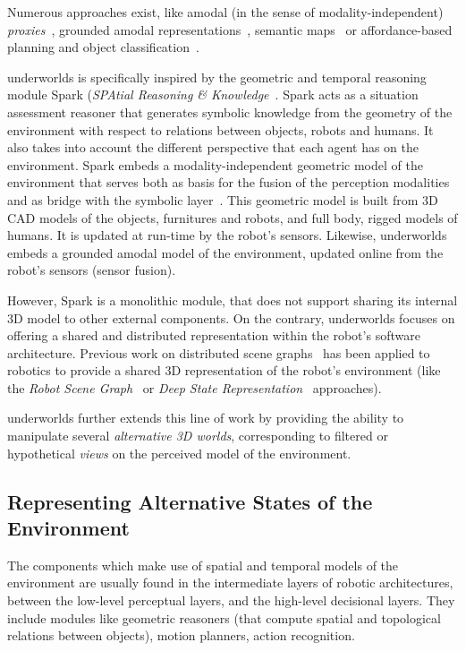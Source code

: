 \documentclass[letterpaper, 10 pt, conference]{ieeeconf}  %
\newcommand{\uwds}{{\sc underworlds}\xspace}
\begin{document}
Numerous approaches exist, like amodal (in the sense of modality-independent)
\emph{proxies}~\cite{Jacobsson2008}, grounded amodal
representations~\cite{Mavridis2006}, semantic
maps~\cite{Nuechter2008, Galindo2008,Blodow2011} or affordance-based planning
and object classification~\cite{Lorken2008, Varadarajan2011}.


\uwds is specifically inspired by the geometric and temporal reasoning module
{\sc Spark} (\emph{SPAtial Reasoning \& Knowledge}~\cite{sisbot2011situation}.
{\sc Spark} acts as a situation assessment reasoner that generates symbolic
knowledge from the geometry of the environment with respect to relations between
objects, robots and humans. It also takes into account the different perspective
that each agent has on the environment. {\sc Spark} embeds a
modality-independent geometric model of the environment that serves both as
basis for the fusion of the perception modalities and as bridge with the
symbolic layer~\cite{lemaignan2016artificial}. This geometric model is built
from 3D CAD models of the objects, furnitures and robots, and full body, rigged
models of humans.  It is updated at run-time by the robot's sensors.
Likewise, \uwds embeds a grounded amodal model of the environment, updated
online from the robot's sensors (sensor fusion).

However, {\sc Spark} is a monolithic module, that does not support sharing its
internal 3D model to other external components. On the contrary, \uwds focuses
on offering a shared and distributed representation within the robot's software
architecture. Previous work on distributed scene graphs~\cite{naef2003blue} has
been applied to robotics to provide a shared 3D representation of the robot's
environment (like the \emph{Robot Scene Graph}~\cite{blumenthal2013scene} or 
\emph{Deep State Representation}~\cite{bustos2016unified} approaches).

\uwds further extends this line of work by providing the ability to manipulate
several \emph{alternative 3D worlds}, corresponding to filtered or hypothetical
\emph{views} on the perceived model of the environment.


\subsection{Representing Alternative States of the Environment}

The components which make use of spatial and temporal models of the environment
are usually found in the intermediate layers of robotic architectures, between
the low-level perceptual layers, and the high-level decisional layers. They
include modules like geometric reasoners (that compute spatial and topological
relations between objects), motion planners, action recognition.
\end{document}
